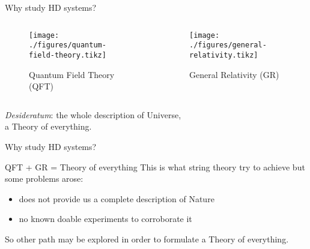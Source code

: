 \begin{frame}{Why study HD systems?}
  \begin{columns}
    \begin{column}{0.5\textwidth}
      \begin{figure}
        \texttt{[image: ./figures/quantum-field-theory.tikz]}
        \caption[labelformat=empty]{Quantum Field Theory (QFT)}\label{fig:QFT}
      \end{figure}
    \end{column}
    \begin{column}{0.5\textwidth}
      \begin{figure}
        \texttt{[image: ./figures/general-relativity.tikz]}
        \caption[labelformat=empty]{General Relativity (GR)}\label{fig:GR}
      \end{figure}
    \end{column}
  \end{columns}
  \vspace{1em}
  \begin{center}
    \emph{Desideratum}: the whole description of Universe, \\
    a \alert{Theory of everything}.
  \end{center}
\end{frame}

\begin{frame}{Why study HD systems?}
  \begin{alertblock}{QFT + GR = Theory of everything}
      \vspace{0.5em}
      This is what string theory try to achieve but some problems arose:
      \begin{itemize}
        \item does not provide us a complete description of Nature
        \item no known doable experiments to corroborate it
      \end{itemize}
  \end{alertblock}
  So other path may be explored in order to formulate a Theory of everything.
\end{frame}

